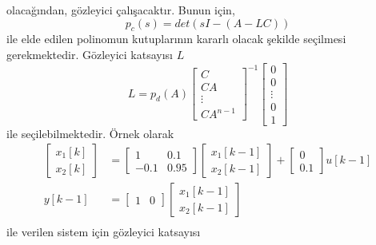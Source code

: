 olacağından, gözleyici çalışacaktır. Bunun için,
\begin{equation}
    p_c(s)=det(sI-(A-LC))
\end{equation}
ile elde edilen polinomun kutuplarının kararlı olacak şekilde seçilmesi gerekmektedir. Gözleyici katsayısı $L$ 
\begin{equation}
    L=p_d(A)\begin{bmatrix}C\\ CA\\ \vdots\\ CA^{n-1}\end{bmatrix}^{-1}\begin{bmatrix}0\\ 0\\ \vdots\\ 0\\ 1\end{bmatrix}
\end{equation}
ile seçilebilmektedir. Örnek olarak
\begin{equation}
    \begin{split}
\begin{bmatrix}
    x_1[k]\\
    x_2[k]
\end{bmatrix}&=
\begin{bmatrix}
    1& 0.1\\
    -0.1& 0.95
\end{bmatrix}\begin{bmatrix}
    x_1[k-1]\\
    x_2[k-1]
\end{bmatrix}+\begin{bmatrix}
    0\\
    0.1
\end{bmatrix}u[k-1]\\
y[k-1]&=\begin{bmatrix}
    1&0 
\end{bmatrix}\begin{bmatrix}
    x_1[k-1]\\
    x_2[k-1]
\end{bmatrix}\\
\end{split}
\end{equation}
ile verilen sistem için gözleyici katsayısı
